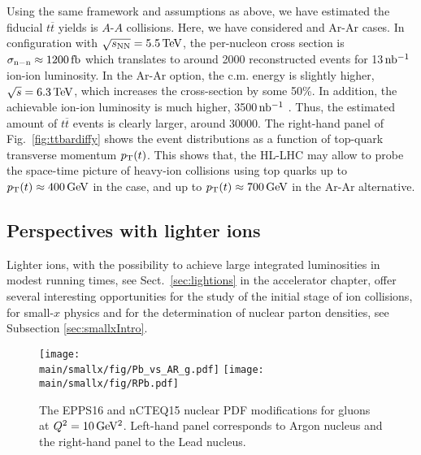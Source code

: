 \documentclass[../report.tex]{subfiles}
\providecommand{\main}{..}
\begin{document}
Using the same framework and assumptions as above, we have estimated the fiducial $t\overline{t}$ yields is $A$-$A$ collisions. Here, we have considered \PbPb and Ar-Ar cases. In \PbPb configuration with $\sqrt{s_{\rm NN}} = 5.5 \, {\rm TeV}$, the per-nucleon cross section is $\sigma_{\rm n-n} \approx 1200 \, {\rm fb}$ which translates to around 2000 reconstructed events for 13$\, \rm nb^{-1}$ ion-ion luminosity. In the Ar-Ar option, the c.m. energy is slightly higher, $\sqrt{s} = 6.3 \, {\rm TeV}$, which increases the cross-section by some 50\%. In addition, the achievable ion-ion luminosity is much higher, 3500$\,\rm nb^{-1}$ \label{sec:lightions} . %
Thus, the estimated amount of $t\overline{t}$ events is clearly larger, around 30000. The right-hand panel of Fig.~\ref{fig:ttbardiffy} shows the event distributions as a function of top-quark transverse momentum $p\sb{\scriptstyle\mathrm{T}}(t)$. This shows that, the HL-LHC may allow to probe the space-time picture of heavy-ion collisions using top quarks \cite{Apolinario:2017sob} up to $p_{\rm T}(t) \approx 400\,{\rm GeV}$ in the \PbPb case, and up to $p_{\rm T}(t) \approx 700\,{\rm GeV}$ in the Ar-Ar alternative. \\






\subsection{Perspectives with lighter ions}
\label{sec:nPDF_lightions}
Lighter ions, with the possibility to achieve large integrated luminosities in modest running times, see Sect.~\ref{sec:lightions} in the accelerator chapter, offer several interesting opportunities for the study of the initial stage of ion collisions, for small-$x$ physics and for the determination of nuclear parton densities, see Subsection \ref{sec:smallxIntro}.

\begin{figure}[htb!]
\centering
\texttt{[image: \\main/smallx/fig/Pb\_vs\_AR\_g.pdf]}
\texttt{[image: \\main/smallx/fig/RPb.pdf]}
\caption{The EPPS16 and nCTEQ15 nuclear PDF modifications for gluons at $Q^2=10\,{\rm GeV^2}$. Left-hand panel corresponds to Argon nucleus and the right-hand panel to the Lead nucleus.}
\label{fig:lightnPDF}
\end{figure}
\end{document}
